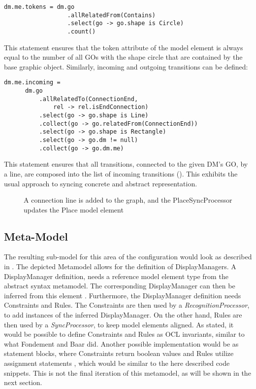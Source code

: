 \begin{lstlisting}[captionpos=b,caption={Rule that syncs the token count of a place element}]
dm.me.tokens = dm.go
                  .allRelatedFrom(Contains)
                  .select(go -> go.shape is Circle)
                  .count()
\end{lstlisting}

This statement ensures that the token attribute of the model element is always equal to the number of all GOs with the shape circle that are contained by the base graphic object. Similarly, incoming and outgoing transitions can be defined:
\begin{lstlisting}[captionpos=b,caption={Rule that syncs incoming transitions of a place element},label={lst:incoming-transitions}]
dm.me.incoming = 
      dm.go
          .allRelatedTo(ConnectionEnd,
              rel -> rel.isEndConnection)
          .select(go -> go.shape is Line)
          .collect(go -> go.relatedFrom(ConnectionEnd))
          .select(go -> go.shape is Rectangle)
          .select(go -> go.dm != null)
          .collect(go -> go.dm.me)
\end{lstlisting}

This statement ensures that all transitions, connected to the given DM's GO, by a line, are composed into the list of incoming transitions (). This exhibits the usual approach to syncing concrete and abstract representation.


\begin{figure}[h]
  \centering
  
  \caption{A connection line is added to the graph, and the PlaceSyncProcessor updates the Place model element}
  \label{fig:incoming-sync}
\end{figure}

\subsection{Meta-Model}
The resulting sub-model for this area of the configuration would look as described in . The depicted Metamodel allows for the definition of DisplayManagers. A DisplayManager definition, needs a reference model element type from the abstract syntax metamodel. The corresponding DisplayManager can then be inferred from this element . Furthermore, the DisplayManager definition needs Constraints and Rules. The Constraints are then used by a \emph{RecognitionProcessor}, to add instances of the inferred DisplayManager. On the other hand, Rules are then used by a \emph{SyncProcessor}, to keep model elements aligned. As stated, it would be possible to define Constraints and Rules as OCL invariants, similar to what Fondement and Baar did. Another possible implementation would be as statement blocks, where Constraints return boolean values and Rules utilize assignment statements , which would be similar to the here described code snippets. This is not the final iteration of this metamodel, as will be shown in the next section.


